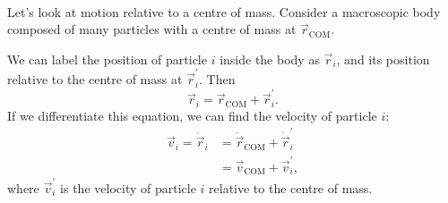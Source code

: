 \documentclass[../classical_mechanics.tex]{subfiles}
\begin{document}
        \paragraph{}
        Let's look at motion relative to a centre of mass.
        Consider a macroscopic body composed of many particles with a centre of mass at $\vec{r}_\text{COM}$.
        \begin{figure}[H]
            \centering
        \end{figure}
        We can label the position of particle $i$ inside the body as $\vec{r}_i$, and its position relative to the centre of mass at $\vec{r}_i^\prime$.
        Then
        \begin{equation}
            \vec{r}_i=\vec{r}_\text{COM}+\vec{r}_i^\prime.
        \end{equation}
        If we differentiate this equation, we can find the velocity of particle $i$:
        \begin{align}
            \vec{v}_i=\dot{\vec{r}}_i&=\dot{\vec{r}}_\text{COM}+\dot{\vec{r}}_i^\prime\\
            &=\vec{v}_\text{COM}+\vec{v}_i^\prime,
        \end{align}
        where $\vec{v}_i^\prime$ is the velocity of particle $i$ relative to the centre of mass.
\end{document}
